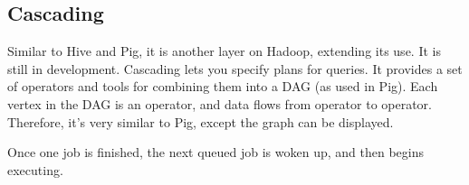 \documentclass[11pt,a4paper,titlepage,dvipsnames,cmyk]{scrartcl}
\begin{document}
\subsection{Cascading}
Similar to Hive and Pig, it is another layer on Hadoop, extending its use. It is still in development. Cascading lets you specify plans for queries. It provides a set of operators and tools for combining them into a DAG (as used in Pig). Each vertex in the DAG is an operator, and data flows from operator to operator. Therefore, it's very similar to Pig, except the graph can be displayed.

Once one job is finished, the next queued job is woken up, and then begins executing.
\end{document}
